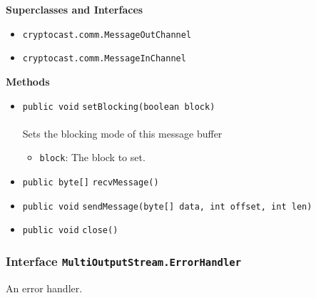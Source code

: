 \textbf{\sffamily Superclasses and Interfaces}
\begin{itemize}
\item \lstinline|cryptocast.comm.MessageOutChannel|
\item \lstinline|cryptocast.comm.MessageInChannel|
\end{itemize}



\textbf{\sffamily Methods}
\begin{itemize}
\item \lstinline|public void| \lstinline|setBlocking|\lstinline|(boolean block)|\\ \\[-0.6em]
Sets the blocking mode of this message buffer
\begin{itemize}
\item \lstinline|block|: The block to set.
\end{itemize}



\item \lstinline|public byte[]| \lstinline|recvMessage|\lstinline|()| \\[-0.6em]




\item \lstinline|public void| \lstinline|sendMessage|\lstinline|(byte[] data, int offset, int len)| \\[-0.6em]




\item \lstinline|public void| \lstinline|close|\lstinline|()| \\[-0.6em]




\end{itemize}

\subsubsection{Interface \lstinline|MultiOutputStream.ErrorHandler|}
An error handler. \\
\noindent\begin{minipage}[t]{5cm}
\vspace{0.3em}
\hspace*{2em}
\vspace{0.3em}
\end{minipage}





